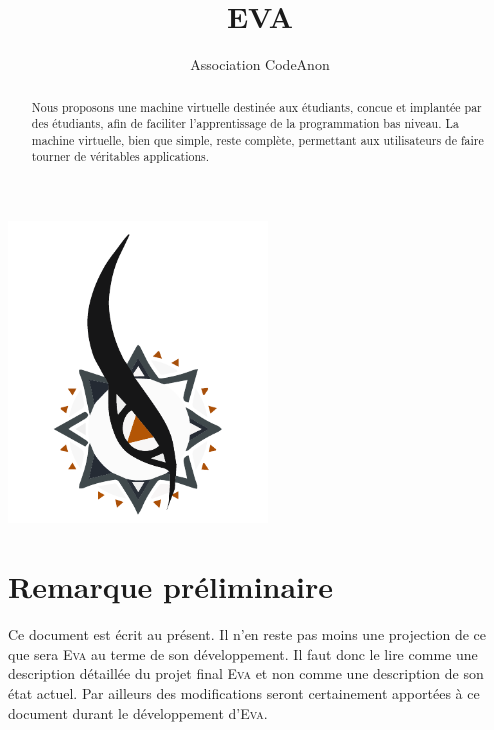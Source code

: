 \documentclass[11pt]{article}
\newcommand{\noun}[1]{\textsc{#1}}
\begin{document}
\title{EVA}
\author{Association CodeAnon}

\maketitle
\begin{abstract}
  Nous proposons une machine virtuelle destinée aux étudiants, concue et implantée par des étudiants, afin de faciliter l'apprentissage de la programmation bas niveau. La machine virtuelle, bien que simple, reste complète, permettant aux utilisateurs de faire tourner de véritables applications.
\end{abstract}
\vfill
\begin{center}
  \includegraphics[height=8cm]{logo_graph.pdf}
\end{center}
\vfill
\cleardoublepage

\hspace{0pt}
\vfill

\section*{Remarque préliminaire}

Ce document est écrit au présent. Il n'en reste pas moins une projection de ce que sera \noun{Eva} au terme de son développement. Il faut donc le lire comme une description détaillée du projet final \noun{Eva} et non comme une description de son état actuel. Par ailleurs des modifications seront certainement apportées à ce document durant le développement d'\noun{Eva}.

\vfill
\hspace{0pt}

\clearpage

\tableofcontents
\cleardoublepage
\end{document}
